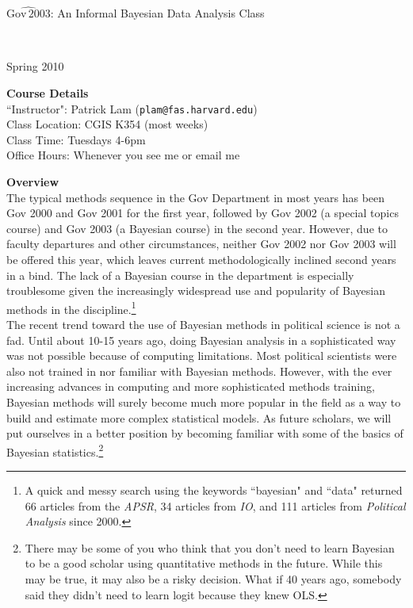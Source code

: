 \documentclass[10pt,a4paper]{article}
\author{Patrick Lam}
\begin{document}
\begin{center}
\begin{Large}$\widehat{\mathrm{Gov} \, 2003}$: An Informal Bayesian Data Analysis Class\end{Large} \\
\medskip
\begin{large}
Spring 2010  \\
\end{large}
\end{center}
\bigskip

\textbf{Course Details} \\

``Instructor": Patrick Lam ({\tt plam@fas.harvard.edu}) \\
Class Location: CGIS K354 (most weeks) \\
Class Time: Tuesdays 4-6pm \\
Office Hours: Whenever you see me or email me \\

\bigskip

\textbf{Overview} \\

The typical methods sequence in the Gov Department in most years has been Gov 2000 and Gov 2001 for the first year, followed by Gov 2002 (a special topics course) and Gov 2003 (a Bayesian course) in the second year.  However, due to faculty departures and other circumstances, neither Gov 2002 nor Gov 2003 will be offered this year, which leaves current methodologically inclined second years in a bind.  The lack of a Bayesian course in the department is especially troublesome given the increasingly widespread use and popularity of Bayesian methods in the discipline.\footnote{A quick and messy search using the keywords ``bayesian" and ``data" returned 66 articles from the \textit{APSR}, 34 articles from \textit{IO}, and 111 articles from \textit{Political Analysis} since 2000.} \\

 The recent trend toward the use of Bayesian methods in political science is not a fad.  Until about 10-15 years ago, doing Bayesian analysis in a sophisticated way was not possible because of computing limitations.  Most political scientists were also not trained in nor familiar with Bayesian methods.  However, with the ever increasing advances in computing and more sophisticated methods training, Bayesian methods will surely become much more popular in the field as a way to build and estimate more complex statistical models.  As future scholars, we will put ourselves in a better position by becoming familiar with some of the basics of Bayesian statistics.\footnote{There may be some of you who think that you don't need to learn Bayesian to be a good scholar using quantitative methods in the future.  While this may be true, it may also be a risky decision.  What if 40 years ago, somebody said they didn't need to learn logit because they knew OLS.} \\
\end{document}
